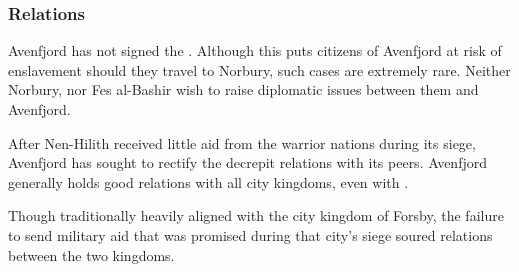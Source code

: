 \subsubsection{Relations}

Avenfjord has not signed the . Although this puts
citizens of Avenfjord at risk of enslavement should they travel to Norbury,
such cases are extremely rare. Neither Norbury, nor Fes al-Bashir wish to
raise diplomatic issues between them and Avenfjord.

After Nen-Hilith received little aid from the warrior nations during its
siege, Avenfjord has sought to rectify the decrepit relations with its
peers. Avenfjord generally holds good relations with all city kingdoms, even
with .

Though traditionally heavily aligned with the city kingdom of Forsby, the
failure to send military aid that was promised during that city's siege
soured relations between the two kingdoms.
